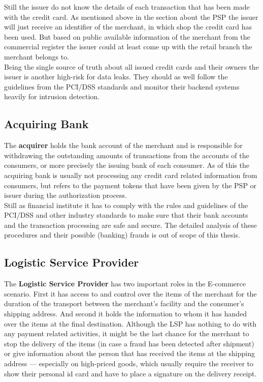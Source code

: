 Still the issuer do not know the details of each transaction that has been made with the credit card. As mentioned above in the section about the \gls{PSP} the issuer will just receive an identifier of the merchant, in which shop the credit card has been used. But based on public available information of the merchant from the commercial register the issuer could at least come up with the retail branch the merchant belongs to. \\

Being the single source of truth about all issued credit cards and their owners the issuer is another high-risk for data leaks. They should as well follow the guidelines from the PCI/DSS standards and monitor their backend systems heavily for intrusion detection.


\subsection{Acquiring Bank}
\label{subsec:stakeholder_acquirer}

The \textbf{acquirer} holds the bank account of the merchant and is responsible for withdrawing the outstanding amounts of transactions from the accounts of the consumers, or more precisely the issuing bank of each consumer. As of this the acquiring bank is usually not processing any credit card related information from consumers, but refers to the payment tokens that have been given by the \gls{PSP} or issuer during the authorization process. \\

Still as financial institute it has to comply with the rules and guidelines of the PCI/DSS and other industry standards to make sure that their bank accounts and the transaction processing are safe and secure. The detailed analysis of these procedures and their possible (banking) frauds is out of scope of this thesis.


\subsection{Logistic Service Provider}
\label{subsec:stakeholder_lsp}

The \textbf{Logistic Service Provider} has two important roles in the E-commerce scenario. First it has access to and control over the items of the merchant for the duration of the transport between the merchant's facility and the consumer's shipping address. And second it holds the information to whom it has handed over the items at the final destination. Although the \gls{LSP} has nothing to do with any payment related activities, it might be the last chance for the merchant to stop the delivery of the items (in case a fraud has been detected after shipment) or give information about the person that has received the items at the shipping address --- especially on high-priced goods, which usually require the receiver to show their personal id card and have to place a signature on the delivery receipt. \\

